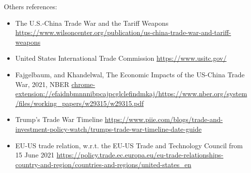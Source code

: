 \footnotesize



Others references:
\begin{itemize}
	\item The U.S.-China Trade War and the Tariff Weapons \url{https://www.wilsoncenter.org/publication/us-china-trade-war-and-tariff-weapons}
	\item United States International Trade Commission \url{https://www.usitc.gov/}
	\item Fajgelbaum, and Khandelwal, The Economic Impacts of the US-China Trade War, 2021, NBER \url{chrome-extension://efaidnbmnnnibpcajpcglclefindmkaj/https://www.nber.org/system/files/working_papers/w29315/w29315.pdf}
	\item Trump's Trade War Timeline \url{https://www.piie.com/blogs/trade-and-investment-policy-watch/trumps-trade-war-timeline-date-guide}
	\item EU-US trade relation, w.r.t. the EU-US Trade and Technology Council from 15 June 2021 \url{https://policy.trade.ec.europa.eu/eu-trade-relationships-country-and-region/countries-and-regions/united-states_en}
\end{itemize}

